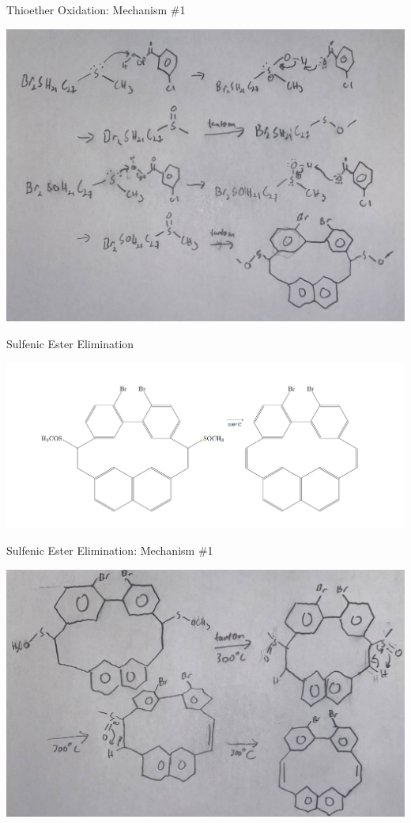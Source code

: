 \documentclass[notes]{beamer}
\begin{document}
\begin{frame}{Thioether Oxidation: Mechanism \#1}
\begin{center}
    \includegraphics[scale=.35]{Thioether_oxidation_one.JPG}
\end{center}
\end{frame}

\begin{frame}{Sulfenic Ester Elimination}
\begin{center}
    \includegraphics[scale=.46]{sulfenic_ester_elimination_overall.PNG}
\end{center}
\end{frame}

\begin{frame}{Sulfenic Ester Elimination: Mechanism \#1}
\begin{center}
    \includegraphics[scale=.37]{sulfinic_ester_elimination one.JPG}
\end{center}
\end{frame}
\end{document}
